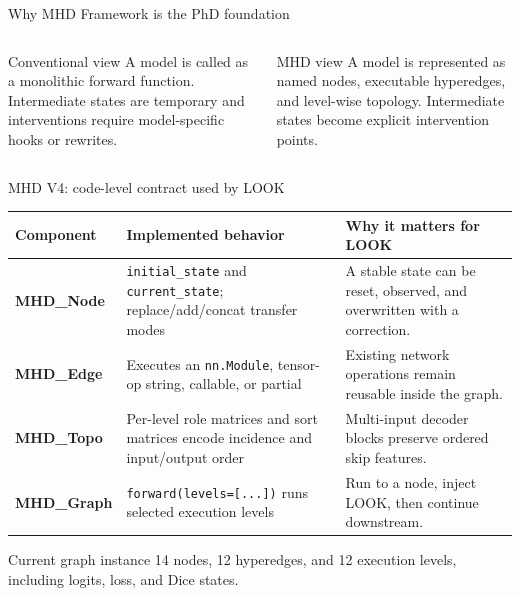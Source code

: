 \documentclass[aspectratio=169,11pt]{beamer}
\begin{document}
\begin{frame}{Why MHD Framework is the PhD foundation}
  \begin{columns}[T,onlytextwidth]
      \begin{alertblock}{Conventional view}
        A model is called as a monolithic forward function. Intermediate states are temporary and
        interventions require model-specific hooks or rewrites.
      \end{alertblock}
      \begin{exampleblock}{MHD view}
        A model is represented as named nodes, executable hyperedges, and level-wise topology.
        Intermediate states become explicit intervention points.
      \end{exampleblock}
  \end{columns}
  \vspace{3mm}
\end{frame}

\begin{frame}{MHD V4: code-level contract used by LOOK}
  \small
  \begin{tabularx}{\textwidth}{>{\bfseries\color{LookNavy}}p{2.35cm} Y Y}
    \toprule
    Component & Implemented behavior & Why it matters for LOOK \\
    \midrule
    MHD\_Node & \texttt{initial\_state} and \texttt{current\_state}; replace/add/concat transfer modes
      & A stable state can be reset, observed, and overwritten with a correction. \\
    MHD\_Edge & Executes an \texttt{nn.Module}, tensor-op string, callable, or partial
      & Existing network operations remain reusable inside the graph. \\
    MHD\_Topo & Per-level role matrices and sort matrices encode incidence and input/output order
      & Multi-input decoder blocks preserve ordered skip features. \\
    MHD\_Graph & \texttt{forward(levels=[...])} runs selected execution levels
      & Run to a node, inject LOOK, then continue downstream. \\
    \bottomrule
  \end{tabularx}
  \vspace{2mm}
  \begin{exampleblock}{Current graph instance}
    14 nodes, 12 hyperedges, and 12 execution levels, including logits, loss, and Dice states.
  \end{exampleblock}
\end{frame}
\end{document}
